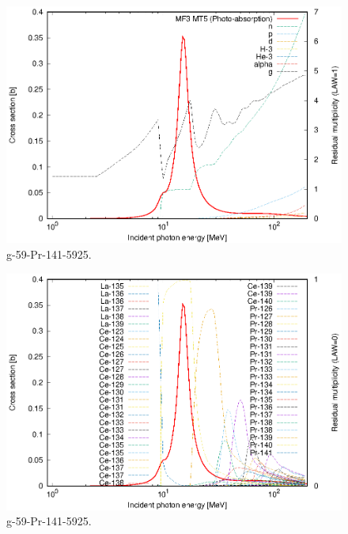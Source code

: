 \begin{figure}
 \includegraphics[width=\linewidth]{eps/g_59-Pr-141_5925.eps}
  \caption{g-59-Pr-141-5925.}
\end{figure}
\begin{figure}
 \includegraphics[width=\linewidth]{eps-law0/g_59-Pr-141_5925.eps}
 \caption{g-59-Pr-141-5925.}
\end{figure}
\newpage \clearpage

